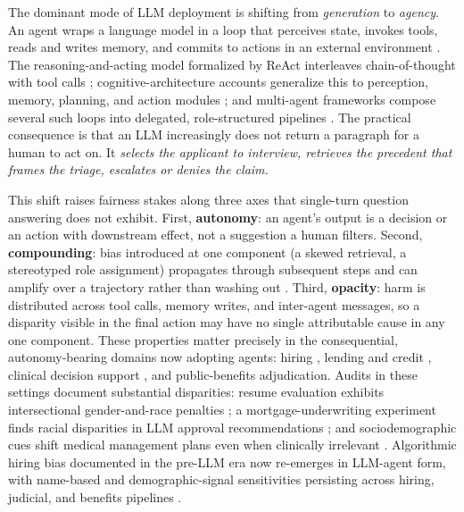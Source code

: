 \documentclass[10pt]{article}
\begin{document}
The dominant mode of LLM deployment is shifting from \emph{generation} to \emph{agency}. An agent wraps a language model in a loop that perceives state, invokes tools, reads and writes memory, and commits to actions in an external environment \cite{wang2024survey,xi2023rise}. The reasoning-and-acting model formalized by ReAct interleaves chain-of-thought with tool calls \cite{yao2023react}; cognitive-architecture accounts generalize this to perception, memory, planning, and action modules \cite{sumers2024cognitive}; and multi-agent frameworks compose several such loops into delegated, role-structured pipelines \cite{wu2023autogen,park2023generative}. The practical consequence is that an LLM increasingly does not return a paragraph for a human to act on. It \emph{selects the applicant to interview, retrieves the precedent that frames the triage, escalates or denies the claim.}

This shift raises fairness stakes along three axes that single-turn question answering does not exhibit. First, \textbf{autonomy}: an agent's output is a decision or an action with downstream effect, not a suggestion a human filters. Second, \textbf{compounding}: bias introduced at one component (a skewed retrieval, a stereotyped role assignment) propagates through subsequent steps and can amplify over a trajectory rather than washing out \cite{ma2026implicit,nguyen2025social}. Third, \textbf{opacity}: harm is distributed across tool calls, memory writes, and inter-agent messages, so a disparity visible in the final action may have no single attributable cause in any one component. These properties matter precisely in the consequential, autonomy-bearing domains now adopting agents: hiring \cite{an2025measuring,veldanda2023emily,nghiem2024you}, lending and credit \cite{bowen2024measuring,feng2023empowering,azime2025accept}, clinical decision support \cite{omar2025sociodemographic,zack2024coding,poulain2024bias}, and public-benefits adjudication. Audits in these settings document substantial disparities: resume evaluation exhibits intersectional gender-and-race penalties \cite{an2025measuring}; a mortgage-underwriting experiment finds racial disparities in LLM approval recommendations \cite{bowen2024measuring}; and sociodemographic cues shift medical management plans even when clinically irrelevant \cite{omar2025sociodemographic}. Algorithmic hiring bias documented in the pre-LLM era \cite{raghavan2020mitigating} now re-emerges in LLM-agent form, with name-based and demographic-signal sensitivities persisting across hiring, judicial, and benefits pipelines \cite{veldanda2023emily,basu2026names,hu2025llms}.
\end{document}
